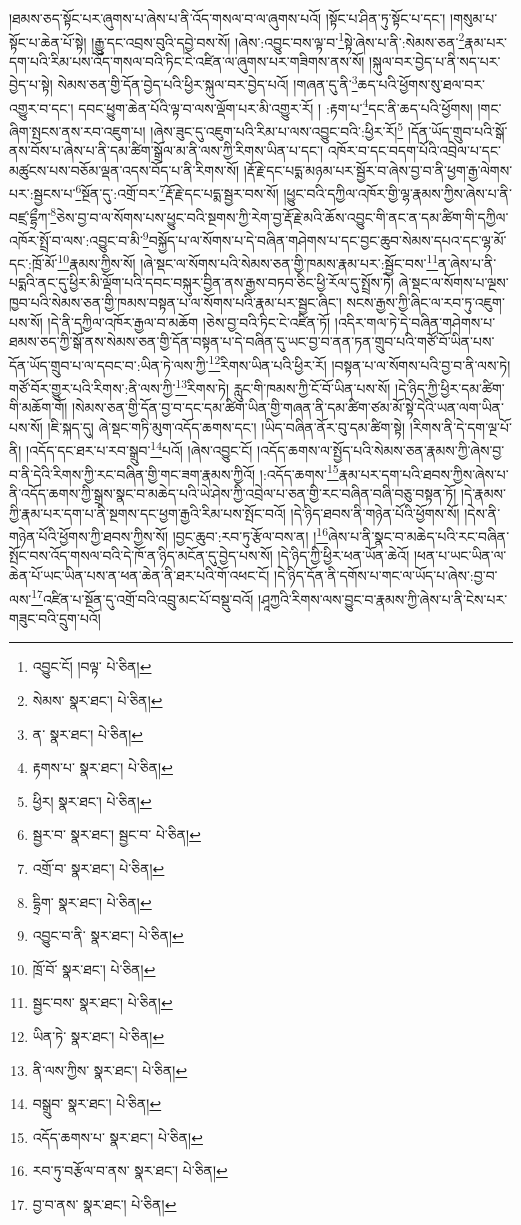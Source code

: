 །ཐམས་ཅད་སྟོང་པར་ཞུགས་པ་ཞེས་པ་ནི་འོད་གསལ་བ་ལ་ཞུགས་པའོ། །སྟོང་པ་ཤིན་ཏུ་སྟོང་པ་དང་། །གསུམ་པ་སྟོང་པ་ཆེན་པོ་སྟེ། །རྒྱུ་དང་འབྲས་བུའི་དབྱེ་བས་སོ། །ཞེས་:འབྱུང་བས་ལྟ་བ་\footnote{འབྱུང་ངོ། །བལྟ་  པེ་ཅིན། }སྟེ་ཞེས་པ་ནི་:སེམས་ཅན་\footnote{སེམས་  སྣར་ཐང་།  པེ་ཅིན། }རྣམ་པར་དག་པའི་རིམ་པས་འོད་གསལ་བའི་ཏིང་ངེ་འཛིན་ལ་ཞུགས་པར་གཟིགས་ནས་སོ། །སྐུལ་བར་བྱེད་པ་ནི་སད་པར་བྱེད་པ་སྟེ། སེམས་ཅན་གྱི་དོན་བྱེད་པའི་ཕྱིར་སྐུལ་བར་བྱེད་པའོ། །གཞན་དུ་ནི་\footnote{ན་  སྣར་ཐང་།  པེ་ཅིན། }ཆད་པའི་ཕྱོགས་སུ་ཐལ་བར་འགྱུར་བ་དང་། དབང་ཕྱུག་ཆེན་པོའི་ལྟ་བ་ལས་ལྡོག་པར་མི་འགྱུར་རོ། །
:རྟག་པ་\footnote{རྟགས་པ་  སྣར་ཐང་།  པེ་ཅིན། }དང་ནི་ཆད་པའི་ཕྱོགས། །གང་ཞིག་སྤངས་ནས་རབ་འཇུག་པ། །ཞེས་ཟུང་དུ་འཇུག་པའི་རིམ་པ་ལས་འབྱུང་བའི་:ཕྱིར་རོ།\footnote{ཕྱིར།  སྣར་ཐང་།  པེ་ཅིན། } །དོན་ཡོད་གྲུབ་པའི་སྒོ་ནས་བོས་པ་ཞེས་པ་ནི་དམ་ཚིག་སྒྲོལ་མ་ནི་ལས་ཀྱི་རིགས་ཡིན་པ་དང་། འཁོར་བ་དང་བདག་པོའི་འབྲེལ་པ་དང་མཚུངས་པས་བཅོམ་ལྡན་འདས་བོད་པ་ནི་རིགས་སོ། །རྡོ་རྗེ་དང་པདྨ་མཉམ་པར་སྦྱོར་བ་ཞེས་བྱ་བ་ནི་ཕྱག་རྒྱ་ལེགས་པར་:སྦྱངས་པ་\footnote{སྦྱར་བ་  སྣར་ཐང་། སྦྱང་བ་  པེ་ཅིན། }སྔོན་དུ་:འགྲོ་བར་\footnote{འགྲོ་བ་  སྣར་ཐང་།  པེ་ཅིན། }རྡོ་རྗེ་དང་པདྨ་སྦྱར་བས་སོ། །ཕྱུང་བའི་དཀྱིལ་འཁོར་གྱི་ལྷ་རྣམས་ཀྱིས་ཞེས་པ་ནི་བཛྲ་དྷྲྀཀ་\footnote{དྷྲིག་  སྣར་ཐང་།  པེ་ཅིན། }ཅེས་བྱ་བ་ལ་སོགས་པས་ཕྱུང་བའི་སྔགས་ཀྱི་རེག་བྱ་རྡོ་རྗེ་མའི་ཆོས་འབྱུང་གི་ནང་ན་དམ་ཚིག་གི་དཀྱིལ་འཁོར་སྤྲོ་བ་ལས་:འབྱུང་བ་མི་\footnote{འབྱུང་བ་ནི་  སྣར་ཐང་།  པེ་ཅིན། }བསྐྱོད་པ་ལ་སོགས་པ་དེ་བཞིན་གཤེགས་པ་དང་བྱང་ཆུབ་སེམས་དཔའ་དང་ལྷ་མོ་དང་:ཁྲོ་མོ་\footnote{ཁྲོ་བོ་  སྣར་ཐང་།  པེ་ཅིན། }རྣམས་ཀྱིས་སོ། །ཞེ་སྡང་ལ་སོགས་པའི་སེམས་ཅན་གྱི་ཁམས་རྣམ་པར་:སྦྱོང་བས་\footnote{སྦྱང་བས་  སྣར་ཐང་།  པེ་ཅིན། }ན་ཞེས་པ་ནི་པདྨའི་ནང་དུ་ཕྱིར་མི་ལྡོག་པའི་དབང་བསྐུར་བྱིན་ནས་རྒྱས་བཏབ་ཅིང་ཕྱི་རོལ་དུ་སྤྲོས་ཏེ། ཞེ་སྡང་ལ་སོགས་པ་ལྔས་ཁྱབ་པའི་སེམས་ཅན་གྱི་ཁམས་བསྟན་པ་ལ་སོགས་པའི་རྣམ་པར་སྦྱང་ཞིང་། སངས་རྒྱས་ཀྱི་ཞིང་ལ་རབ་ཏུ་འཇུག་པས་སོ། །དེ་ནི་དཀྱིལ་འཁོར་རྒྱལ་བ་མཆོག །ཅེས་བྱ་བའི་ཏིང་ངེ་འཛིན་ཏོ། །འདིར་གལ་ཏེ་དེ་བཞིན་གཤེགས་པ་ཐམས་ཅད་ཀྱི་སྒོ་ནས་སེམས་ཅན་གྱི་དོན་བསྟན་པ་དེ་བཞིན་དུ་ཡང་བྱ་བ་ནན་ཏན་གྲུབ་པའི་གཙོ་བོ་ཡིན་པས་དོན་ཡོད་གྲུབ་པ་ལ་དབང་བ་:ཡིན་ཏེ་ལས་ཀྱི་\footnote{ཡིན་ཏེ་  སྣར་ཐང་།  པེ་ཅིན། }རིགས་ཡིན་པའི་ཕྱིར་རོ། །བསྟན་པ་ལ་སོགས་པའི་བྱ་བ་ནི་ལས་ཏེ། གཙོ་བོར་གྱུར་པའི་རིགས་:ནི་ལས་ཀྱི་\footnote{ནི་ལས་ཀྱིས་  སྣར་ཐང་།  པེ་ཅིན། }རིགས་ཏེ། རླུང་གི་ཁམས་ཀྱི་ངོ་བོ་ཡིན་པས་སོ། །དེ་ཉིད་ཀྱི་ཕྱིར་དམ་ཚིག་གི་མཆོག་གོ། །སེམས་ཅན་གྱི་དོན་བྱ་བ་དང་དམ་ཚིག་ཡིན་གྱི་གཞན་ནི་དམ་ཚིག་ཙམ་མོ་སྟེ་དེའི་ཡན་ལག་ཡིན་པས་སོ། །ཇི་སྐད་དུ། ཞེ་སྡང་གཏི་མུག་འདོད་ཆགས་དང་། །ཡིད་བཞིན་ནོར་བུ་དམ་ཚིག་སྟེ། །རིགས་ནི་དེ་དག་ལྔ་པོ་ནི། །འདོད་དང་ཐར་པ་རབ་སྒྲུབ་\footnote{བསྒྲུབ་  སྣར་ཐང་།  པེ་ཅིན། }པའོ། །ཞེས་འབྱུང་ངོ། །འདོད་ཆགས་ལ་སྤྱོད་པའི་སེམས་ཅན་རྣམས་ཀྱི་ཞེས་བྱ་བ་ནི་དེའི་རིགས་ཀྱི་རང་བཞིན་གྱི་གང་ཟག་རྣམས་ཀྱིའོ། །:འདོད་ཆགས་\footnote{འདོད་ཆགས་པ་  སྣར་ཐང་།  པེ་ཅིན། }རྣམ་པར་དག་པའི་ཐབས་ཀྱིས་ཞེས་པ་ནི་འདོད་ཆགས་ཀྱི་སྒྲས་སྣང་བ་མཆེད་པའི་ཡེ་ཤེས་ཀྱི་འབྲེལ་པ་ཅན་གྱི་རང་བཞིན་བཞི་བཅུ་བསྟན་ཏོ། །དེ་རྣམས་ཀྱི་རྣམ་པར་དག་པ་ནི་སྔགས་དང་ཕྱག་རྒྱའི་རིམ་པས་སྤོང་བའོ། །དེ་ཉིད་ཐབས་ནི་གཉེན་པོའི་ཕྱོགས་སོ། །དེས་ནི་གཉེན་པོའི་ཕྱོགས་ཀྱི་ཐབས་ཀྱིས་སོ། །བྱང་ཆུབ་:རབ་ཏུ་རྩོལ་བས་ན། །\footnote{རབ་ཏུ་བརྩོལ་བ་ནས་  སྣར་ཐང་།  པེ་ཅིན། }ཞེས་པ་ནི་སྣང་བ་མཆེད་པའི་རང་བཞིན་སྤོང་བས་འོད་གསལ་བའི་དེ་ཁོ་ན་ཉིད་མངོན་དུ་བྱེད་པས་སོ། །དེ་ཉིད་ཀྱི་ཕྱིར་ཕན་ཡོན་ཆེའོ། །ཕན་པ་ཡང་ཡིན་ལ་ཆེན་པོ་ཡང་ཡིན་པས་ན་ཕན་ཆེན་ནི་ཐར་པའི་གོ་འཕང་ངོ། །དེ་ཉིད་དོན་ནི་དགོས་པ་གང་ལ་ཡོད་པ་ཞེས་:བྱ་བ་ལས་\footnote{བྱ་བ་ནས་  སྣར་ཐང་།  པེ་ཅིན། }འཛིན་པ་སྔོན་དུ་འགྲོ་བའི་འབྲུ་མང་པོ་བསྡུ་བའོ། །ཤཱཀྱའི་རིགས་ལས་བྱུང་བ་རྣམས་ཀྱི་ཞེས་པ་ནི་ངེས་པར་གཟུང་བའི་དྲུག་པའོ། 